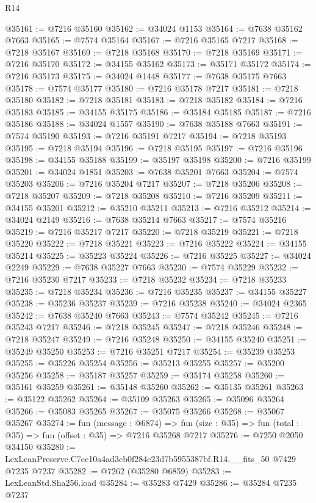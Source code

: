 \begin{lexlean}{R14}
\begin{coremodule}
@35161 := @7216 @35160
@35162 := @34024 @1153
@35164 := @7638 @35162 @7663
@35165 := @7574 @35164
@35167 := @7216 @35165 @7217
@35168 := @7218 @35167
@35169 := @7218 @35168
@35170 := @7218 @35169
@35171 := @7216 @35170
@35172 := @34155 @35162
@35173 := @35171 @35172
@35174 := @7216 @35173
@35175 := @34024 @1448
@35177 := @7638 @35175 @7663
@35178 := @7574 @35177
@35180 := @7216 @35178 @7217
@35181 := @7218 @35180
@35182 := @7218 @35181
@35183 := @7218 @35182
@35184 := @7216 @35183
@35185 := @34155 @35175
@35186 := @35184 @35185
@35187 := @7216 @35186
@35188 := @34024 @1557
@35190 := @7638 @35188 @7663
@35191 := @7574 @35190
@35193 := @7216 @35191 @7217
@35194 := @7218 @35193
@35195 := @7218 @35194
@35196 := @7218 @35195
@35197 := @7216 @35196
@35198 := @34155 @35188
@35199 := @35197 @35198
@35200 := @7216 @35199
@35201 := @34024 @1851
@35203 := @7638 @35201 @7663
@35204 := @7574 @35203
@35206 := @7216 @35204 @7217
@35207 := @7218 @35206
@35208 := @7218 @35207
@35209 := @7218 @35208
@35210 := @7216 @35209
@35211 := @34155 @35201
@35212 := @35210 @35211
@35213 := @7216 @35212
@35214 := @34024 @2149
@35216 := @7638 @35214 @7663
@35217 := @7574 @35216
@35219 := @7216 @35217 @7217
@35220 := @7218 @35219
@35221 := @7218 @35220
@35222 := @7218 @35221
@35223 := @7216 @35222
@35224 := @34155 @35214
@35225 := @35223 @35224
@35226 := @7216 @35225
@35227 := @34024 @2249
@35229 := @7638 @35227 @7663
@35230 := @7574 @35229
@35232 := @7216 @35230 @7217
@35233 := @7218 @35232
@35234 := @7218 @35233
@35235 := @7218 @35234
@35236 := @7216 @35235
@35237 := @34155 @35227
@35238 := @35236 @35237
@35239 := @7216 @35238
@35240 := @34024 @2365
@35242 := @7638 @35240 @7663
@35243 := @7574 @35242
@35245 := @7216 @35243 @7217
@35246 := @7218 @35245
@35247 := @7218 @35246
@35248 := @7218 @35247
@35249 := @7216 @35248
@35250 := @34155 @35240
@35251 := @35249 @35250
@35253 := @7216 @35251 @7217
@35254 := @35239 @35253
@35255 := @35226 @35254
@35256 := @35213 @35255
@35257 := @35200 @35256
@35258 := @35187 @35257
@35259 := @35174 @35258
@35260 := @35161 @35259
@35261 := @35148 @35260
@35262 := @35135 @35261
@35263 := @35122 @35262
@35264 := @35109 @35263
@35265 := @35096 @35264
@35266 := @35083 @35265
@35267 := @35075 @35266
@35268 := @35067 @35267
@35274 := fun (message : @6874) =>
  fun (size : @35) => fun (total : @35) => fun (offset : @35) => @7216 @35268 @7217
@35276 := @7250 @2050 @34150
@35280 := LexLeanPreserve.C7ec10a4ad3cb0f284e23d7b5955387bf.R14.__fits_50 @7429 @7235 @7237
@35282 := @7262 (@35280 @6859)
@35283 := LexLeanStd.Sha256.load
@35284 := @35283 @7429
@35286 := @35284 @7235 @7237

\end{coremodule}
\end{lexlean}
